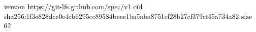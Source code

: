 version https://git-lfs.github.com/spec/v1
oid sha256:1f3e828dce0e4cb6295cc89584beee1ba5aba8751ef28b27ef379cf45a734a82
size 62
